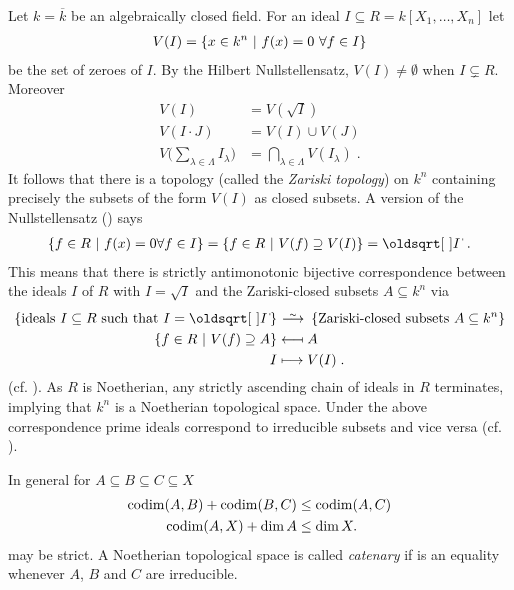 \documentclass[a4paper,parskip=full,numbers=enddot]{scrreprt}
\begin{document}
\begin{example}
  Let $k =\overline{k}$ be an algebraically closed field. For an ideal $I\subseteq R = k[X_1,\ldots,X_n]$ let 
  \begin{align*}
  	V(I) = \left\{x\in k^n\ \middle|\  f(x)=0\ \forall f\in I\right\}
  \end{align*}
  be the set of zeroes of $I$. By the Hilbert Nullstellensatz, $V(I) \neq \emptyset$ when $I\subsetneq R$. Moreover 
  \begin{align*}
    V(I)& = V\left(\sqrt{I}\right)\\
    V(I\cdot J ) &= V(I) \cup V(J)\\
    V\bigg(\sum_{\lambda\in\Lambda} I_\lambda\bigg) &=\bigcap_{\lambda\in\Lambda} V(I_\lambda)\;.
 \end{align*}
 It follows that there is a topology (called the \emph{Zariski topology}) on $k^n$ containing precisely the subsets of the form $V(I)$ as closed subsets. A version of the Nullstellensatz (\cite[Proposition~1.7.1]{alg1}) says
 \begin{align*}
  \left\{f\in R\st f(x) = 0\forall f\in I\right\} = \left\{f\in R\st V(f)\supseteq V(I)\right\} = \sqrt{I}\;.
 \end{align*}
 This means that there is strictly antimonotonic bijective correspondence between the ideals $I$ of $R$ with $I=\sqrt{I}$ and the Zariski-closed subsets $A\subseteq k^n$ via
 \begin{align*}
	 \left\{\text{ideals }I\subseteq R\text{ such that }I=\sqrt I\right\}&\isomorphism\left\{\text{Zariski-closed subsets }A\subseteq k^n\right\}\\
    \left\{f\in R\st V(f)\supseteq A\right\} &\longmapsfrom A\\
    I&\longmapsto V(I)\;.
 \end{align*}
 (cf. \cite[Remark~2.1.1]{alg1}). As $R$ is Noetherian, any strictly ascending chain of ideals in $R$ terminates, implying that $k^n$ is a Noetherian topological space. Under the above correspondence prime ideals correspond to irreducible subsets and vice versa (cf. \cite[Proposition~2.1.2]{alg1}).  
\end{example}
\begin{rem}
 In general for $A\subseteq B\subseteq C\subseteq X$
 \begin{align}\lbl{eq:codimIneq}
    \codim(A,B) +\codim(B,C) &\leq \codim(A,C) \\ 
    \codim(A,X)+\dim A &\leq \dim X.\lbl{eq:codimIneq2}
 \end{align}
 may be strict. A Noetherian topological space is called \emph{catenary} if  is an equality whenever $A$, $B$ and $C$ are irreducible.

\end{rem}
\end{document}

